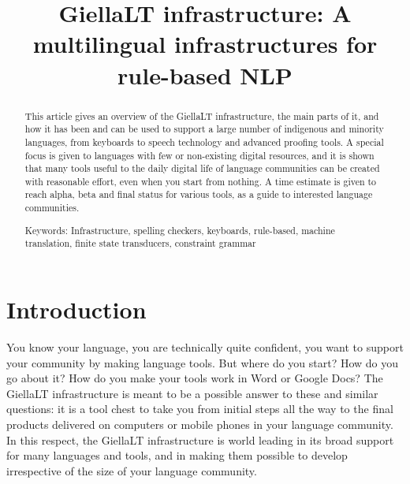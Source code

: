 \documentclass[free]{flammie}
\newif\ifcameraready
\begin{document}
\title{GiellaLT infrastructure: A multilingual infrastructures for rule-based
NLP}


\ifcameraready
\author{
Sjur Nørstebø Moshagen, Flammie Pirinen, Lene Antonsen, Børre Gaup, Inga
Mikkelsen, Trond Trosterud, Linda Wiechetek, Katri Hiovain-Asikainen\\
Department of Language and Culture\\
NO-9019 UiT The Arctic University of Norway, Norway\\
\url{sjur.n.moshagen@uit.no}
}
\fi

\maketitle

\begin{abstract}
This article gives an overview of the GiellaLT infrastructure, the main parts of
    it, and how it has been and can be used to support a large number of
    indigenous and minority languages, from keyboards to speech technology and
    advanced proofing tools. A special focus is given to languages with few or
    non-existing digital resources, and it is shown that many tools useful to
    the daily digital life of language communities can be created with
    reasonable effort, even when you start from nothing. A time estimate is
    given to reach alpha, beta and final status for various tools, as a guide to
    interested language communities.

    Keywords: Infrastructure, spelling checkers, keyboards, rule-based, machine
    translation, finite state transducers, constraint grammar
\end{abstract}


\section{Introduction}

You know your language, you are technically quite confident, you want to support
your community by making language tools. But where do you start? How do you go
about it?  How do you make your tools work in Word or Google Docs? The GiellaLT
infrastructure is meant to be a possible answer to these and similar questions:
it is a tool chest to take you from initial steps all the way to the final
products delivered on computers or mobile phones in your language community. In
this respect, the GiellaLT infrastructure is world leading in its broad support
for many languages and tools, and in making them possible to develop
irrespective of the size of your language community.
\end{document}
